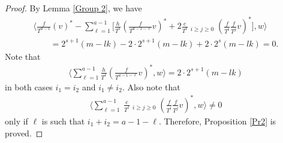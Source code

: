 \documentclass[11pt]{article}
\numberwithin{equation}{section}
\begin{document}
\begin{proof}
By Lemma \ref{Group 2}, we have
\begin{gather*}
\bigg\langle \frac{f}{T^{a-1}} (v)^*-
\sum_{\ell=1}^{a-1}\bigg[\frac{h}{T^{\ell}}\left(
\frac{f}{T^{a-1-\ell}}v\right)^* + 2\frac{e}{T^{\ell}} \mathop{\sum_{i+j=a-1-\ell}}_{i\geq j\geq 0} \left(\frac{f}{T^i}\frac{f}{T^j}v\right)^*\bigg], w \bigg\rangle \\
\qquad{} = 2^{s+1} (m-lk) - 2 \cdot 2^{s+1} (m-lk) + 2 \cdot 2^{s} (m-lk) = 0.
\end{gather*}
Note that
\begin{gather*}
 \bigg\langle \sum_{\ell=1}^{a-1} \frac{h}{T^{\ell}}\left(\frac{f}{T^{a-1-\ell}}v\right)^*, w \bigg\rangle = 2 \cdot 2^{s+1} (m - lk)
\end{gather*}
in both cases $i_1 = i_2$ and $i_1 \ne i_2$. Also note that
\begin{gather*}
\bigg\langle \sum_{\ell=1}^{a-1}\ \frac{e}{T^{\ell}} \mathop{\sum_{i+j=a-1-\ell}}_{i\geq j\geq 0} \left(\frac{f}{T^i}\frac{f}{T^j}v\right)^*, w \bigg\rangle \ne 0
\end{gather*}
only if $\ell$ is such that $i_1+i_2 = a-1-\ell$. Therefore, Proposition \ref{Pr2} is proved.
\end{proof}
\end{document}
